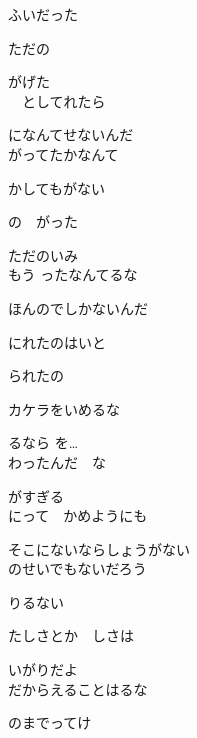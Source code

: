 ふいだった

ただの

がげた
\\

　としてれたら

になんてせないんだ
\\

がってたかなんて

かしてもがない

の　がった

ただのいみ
\\

もう ったなんてるな

ほんのでしかないんだ

にれたのはいと

られたの

カケラをいめるな

るなら を…
\\

わったんだ　な

がすぎる
\\

にって　かめようにも

そこにないならしょうがない
\\

のせいでもないだろう

りるない

たしさとか　しさは

いがりだよ
\\

だからえることはるな

のまでってけ

